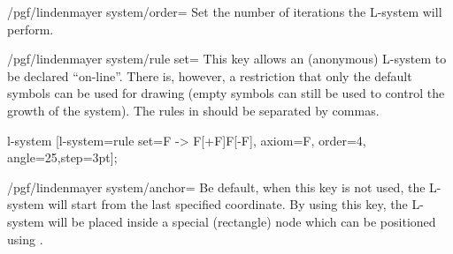\begin{key}{/pgf/lindenmayer system/order=}
  Set the number of iterations the L-system will perform.
\end{key}

\begin{key}{/pgf/lindenmayer system/rule set=}
  This key allows an (anonymous) L-system to be declared ``on-line''.
  There is, however, a restriction that only the default symbols can be
  used for drawing (empty symbols can still be used to control
  the growth of the system). The rules in  should
  be separated by commas.

\begin{codeexample}[]
\tikz[rotate=65] l-system
  [l-system={rule set={F -> F[+F]F[-F]}, axiom=F, order=4, angle=25,step=3pt}];
\end{codeexample}
\end{key}

\begin{key}{/pgf/lindenmayer system/anchor=}
  Be default, when this key is not used, the L-system will start from
  the last specified coordinate. By using this key, the L-system
  will be placed inside a special (rectangle) node which can be
	positioned using .


\begin{codeexample}[]
\end{codeexample}
\end{key}
